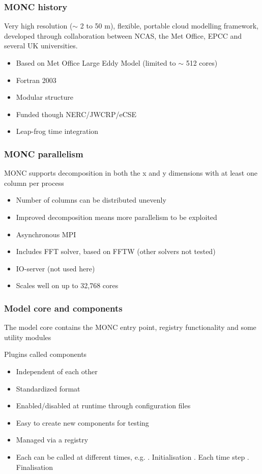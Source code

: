\documentclass{beamer}
\begin{document}
 
\begin{frame}
\frametitle{MONC history}

Very high resolution ($\mathsf{\sim}$ 2 to 50 m), flexible, portable cloud modelling 
framework, developed through collaboration between NCAS, the Met 
Office, EPCC and several UK universities.
\begin{itemize}
\item Based on Met Office Large Eddy Model (limited to $\sim$  512 cores)
\item Fortran 2003
\item Modular structure
\item Funded though NERC/JWCRP/eCSE
\item Leap-frog time integration
\end{itemize}
\end{frame}

\begin{frame}
\frametitle{MONC parallelism}

MONC supports decomposition in both the x and y dimensions with at least one column per process
\begin{itemize}
\item Number of columns can be distributed unevenly
\item Improved decomposition means more parallelism to be exploited
\item Asynchronous MPI
\item Includes FFT solver, based on FFTW (other solvers not tested)
\item IO-server (not used here)
\item Scales well on up to 32,768 cores
\end{itemize}
\end{frame}

\begin{frame}
\frametitle{Model core and components}

The model core  contains the MONC entry point, registry functionality and some utility modules

Plugins called components
\begin{itemize}
\item Independent of each other
\item Standardized format
\item Enabled/disabled at runtime through configuration files
\item Easy to create new components for testing
\item Managed via a registry
\item Each can be called at different times, e.g. . Initialisation . Each time step . Finalisation \newline
\end{itemize}
\end{frame}
\end{document}
